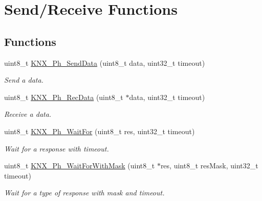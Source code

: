 \hypertarget{group___k_n_x___p_h___sup___exported___functions___group2}{}\section{Send/\+Receive Functions}
\label{group___k_n_x___p_h___sup___exported___functions___group2}
\subsection*{Functions}
\begin{DoxyCompactItemize}
\item 
uint8\+\_\+t \hyperlink{group___k_n_x___p_h___sup___exported___functions___group2_ga99d547995ed3a2a7331d1f074197ab4b}{K\+N\+X\+\_\+\+Ph\+\_\+\+Send\+Data} (uint8\+\_\+t data, uint32\+\_\+t timeout)
\begin{DoxyCompactList}\small\item\em Send a data. \end{DoxyCompactList}\item 
uint8\+\_\+t \hyperlink{group___k_n_x___p_h___sup___exported___functions___group2_ga6ff7e84102b49b1cb9677d4b43c52616}{K\+N\+X\+\_\+\+Ph\+\_\+\+Rec\+Data} (uint8\+\_\+t $\ast$data, uint32\+\_\+t timeout)
\begin{DoxyCompactList}\small\item\em Receive a data. \end{DoxyCompactList}\item 
uint8\+\_\+t \hyperlink{group___k_n_x___p_h___sup___exported___functions___group2_ga5c5b1af8b0ba06771d5b16fee4547f87}{K\+N\+X\+\_\+\+Ph\+\_\+\+Wait\+For} (uint8\+\_\+t res, uint32\+\_\+t timeout)
\begin{DoxyCompactList}\small\item\em Wait for a response with timeout. \end{DoxyCompactList}\item 
uint8\+\_\+t \hyperlink{group___k_n_x___p_h___sup___exported___functions___group2_ga4bede9df3610d29290973ac067ac93ae}{K\+N\+X\+\_\+\+Ph\+\_\+\+Wait\+For\+With\+Mask} (uint8\+\_\+t $\ast$res, uint8\+\_\+t res\+Mask, uint32\+\_\+t timeout)
\begin{DoxyCompactList}\small\item\em Wait for a type of response with mask and timeout. \end{DoxyCompactList}\end{DoxyCompactItemize}


